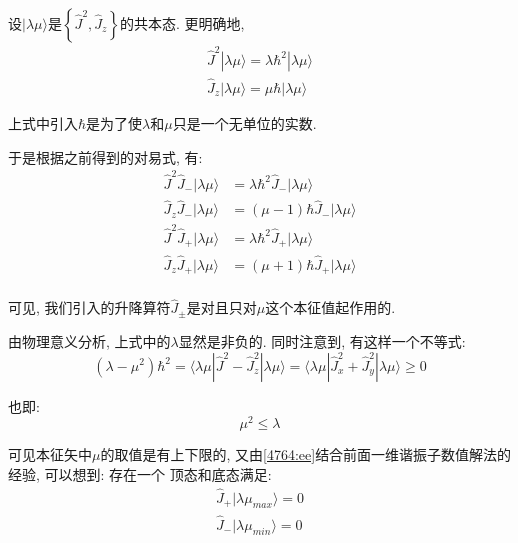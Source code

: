 \documentclass[a4paper, 11pt]{article}
\begin{document}
\begin{spacing}{1.2}
      设$|\lambda\mu\rangle$是$\left\{\hat{J}^2,\hat{J}_z\right\}$的共本态. 更明确地,
      \begin{equation}
        \begin{aligned}
          \hat{J}^2|\lambda\mu\rangle = \lambda\hbar^2|\lambda\mu\rangle\\
          \hat{J}_z|\lambda\mu\rangle = \mu\hbar|\lambda\mu\rangle
        \end{aligned}
      \end{equation}

      上式中引入$\hbar$是为了使$\lambda$和$\mu$只是一个无单位的实数. 

      于是根据之前得到的对易式, 有:
      \begin{equation}
        \begin{aligned}
          \hat{J}^2\hat{J}_-|\lambda\mu\rangle &= \lambda\hbar^2\hat{J}_-|\lambda\mu\rangle\\
          \hat{J}_z\hat{J}_-|\lambda\mu\rangle &= (\mu-1)\hbar\hat{J}_-|\lambda\mu\rangle\\
          \hat{J}^2\hat{J}_+|\lambda\mu\rangle &= \lambda\hbar^2\hat{J}_+|\lambda\mu\rangle\\
          \hat{J}_z\hat{J}_+|\lambda\mu\rangle &= (\mu+1)\hbar\hat{J}_+|\lambda\mu\rangle\\
        \end{aligned}
      \end{equation}

      可见, 我们引入的升降算符$\hat{J}_{\pm}$是对且只对$\mu$这个本征值起作用的.

      由物理意义分析, 上式中的$\lambda$显然是非负的. 同时注意到, 有这样一个不等式:
      \begin{equation}
        (\lambda-\mu^2)\hbar^2
        =\langle\lambda\mu|\hat{J}^2-\hat{J}_z^2|\lambda\mu\rangle %
        =\langle\lambda\mu|\hat{J}_x^2+\hat{J}_y^2|\lambda\mu\rangle%
        \geq 0 
      \end{equation}

      也即:
      \begin{equation}
        \mu^2\leq\lambda
      \end{equation}

      可见本征矢中$\mu$的取值是有上下限的, 又由\eqref{4764:ee}结合前面一维谐振子数值解法的经验, 可以想到: 存在一个
      顶态和底态满足:
      \begin{equation}
        \begin{aligned}
          \hat{J}_+|\lambda\mu_{max}\rangle = 0\\
          \hat{J}_-|\lambda\mu_{min}\rangle = 0
        \end{aligned}
      \end{equation}


\end{spacing}
\end{document}
